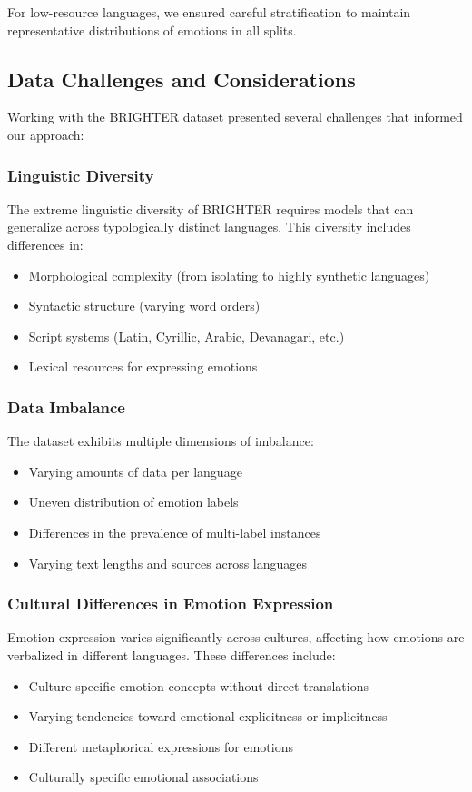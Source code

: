 \documentclass[a4paper,12pt]{extarticle}
\begin{document}
For low-resource languages, we ensured careful stratification to maintain representative distributions of emotions in all splits.

\subsection{Data Challenges and Considerations}

Working with the BRIGHTER dataset presented several challenges that informed our approach:

\subsubsection{Linguistic Diversity}

The extreme linguistic diversity of BRIGHTER requires models that can generalize across typologically distinct languages. This diversity includes differences in:
\begin{itemize}
\item Morphological complexity (from isolating to highly synthetic languages)
\item Syntactic structure (varying word orders)
\item Script systems (Latin, Cyrillic, Arabic, Devanagari, etc.)
\item Lexical resources for expressing emotions
\end{itemize}

\subsubsection{Data Imbalance}

The dataset exhibits multiple dimensions of imbalance:
\begin{itemize}
\item Varying amounts of data per language
\item Uneven distribution of emotion labels
\item Differences in the prevalence of multi-label instances
\item Varying text lengths and sources across languages
\end{itemize}

\subsubsection{Cultural Differences in Emotion Expression}

Emotion expression varies significantly across cultures, affecting how emotions are verbalized in different languages. These differences include:
\begin{itemize}
\item Culture-specific emotion concepts without direct translations
\item Varying tendencies toward emotional explicitness or implicitness
\item Different metaphorical expressions for emotions
\item Culturally specific emotional associations
\end{itemize}
\end{document}
